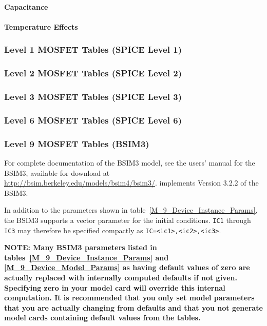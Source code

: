 \paragraph{Capacitance}

\clearpage
\paragraph{Temperature Effects}

\clearpage
\subsubsection{Level 1 MOSFET Tables (SPICE Level 1)}


\clearpage
\subsubsection{Level 2 MOSFET Tables (SPICE Level 2)}


\clearpage
\subsubsection{Level 3 MOSFET Tables (SPICE Level 3)}


\clearpage
\subsubsection{Level 6 MOSFET Tables (SPICE Level 6)}


\clearpage
\subsubsection{Level 9 MOSFET Tables (BSIM3)}
For complete documentation of the BSIM3 model, see the users' manual for
the BSIM3, available for download at
\url{http://bsim.berkeley.edu/models/bsim4/bsim3/}.
\Xyce{} implements Version 3.2.2 of the BSIM3.

In addition to the parameters shown in
table~\ref{M_9_Device_Instance_Params}, the BSIM3 supports a vector
parameter for the initial conditions.  \texttt{IC1} through
\texttt{IC3} may therefore be specified compactly as
\texttt{IC=<ic1>,<ic2>,<ic3>}.

\textbf{NOTE:  Many BSIM3 parameters listed in
tables~\ref{M_9_Device_Instance_Params} and \ref{M_9_Device_Model_Params} as
having default values of zero are actually replaced with internally computed
defaults if not given.  Specifying zero in your model card will override this
internal computation.  It is recommended that you only set model parameters
that you are actually changing from defaults and that you not generate model
cards containing default values from the tables.}




